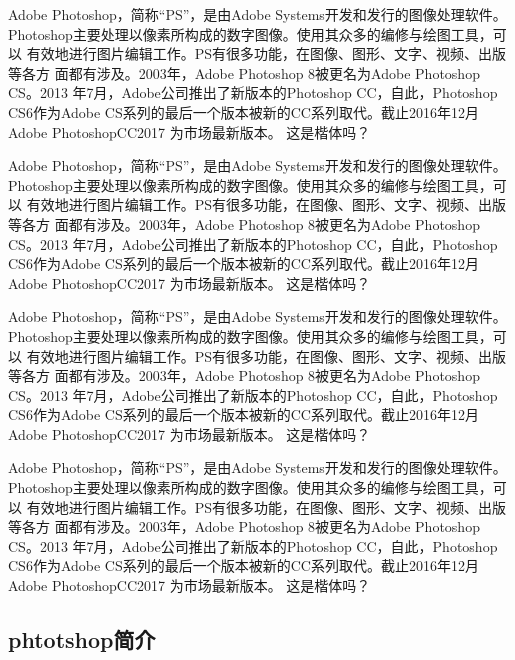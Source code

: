   Adobe Photoshop，简称“PS”，是由Adobe Systems开发和发行的图像处理软件。
 Photoshop主要处理以像素所构成的数字图像。使用其众多的编修与绘图工具，可以
 有效地进行图片编辑工作。PS有很多功能，在图像、图形、文字、视频、出版等各方
 面都有涉及。2003年，Adobe Photoshop 8被更名为Adobe Photoshop CS。2013
 年7月，Adobe公司推出了新版本的Photoshop CC，自此，Photoshop CS6作为Adobe
 CS系列的最后一个版本被新的CC系列取代。截止2016年12月Adobe PhotoshopCC2017
 为市场最新版本。
 {\kaishu 这是楷体吗？}
 
  Adobe Photoshop，简称“PS”，是由Adobe Systems开发和发行的图像处理软件。
 Photoshop主要处理以像素所构成的数字图像。使用其众多的编修与绘图工具，可以
 有效地进行图片编辑工作。PS有很多功能，在图像、图形、文字、视频、出版等各方
 面都有涉及。2003年，Adobe Photoshop 8被更名为Adobe Photoshop CS。2013
 年7月，Adobe公司推出了新版本的Photoshop CC，自此，Photoshop CS6作为Adobe
 CS系列的最后一个版本被新的CC系列取代。截止2016年12月Adobe PhotoshopCC2017
 为市场最新版本。
 {\kaishu 这是楷体吗？}
 
  Adobe Photoshop，简称“PS”，是由Adobe Systems开发和发行的图像处理软件。
 Photoshop主要处理以像素所构成的数字图像。使用其众多的编修与绘图工具，可以
 有效地进行图片编辑工作。PS有很多功能，在图像、图形、文字、视频、出版等各方
 面都有涉及。2003年，Adobe Photoshop 8被更名为Adobe Photoshop CS。2013
 年7月，Adobe公司推出了新版本的Photoshop CC，自此，Photoshop CS6作为Adobe
 CS系列的最后一个版本被新的CC系列取代。截止2016年12月Adobe PhotoshopCC2017
 为市场最新版本。
 {\kaishu 这是楷体吗？}
 
  Adobe Photoshop，简称“PS”，是由Adobe Systems开发和发行的图像处理软件。
 Photoshop主要处理以像素所构成的数字图像。使用其众多的编修与绘图工具，可以
 有效地进行图片编辑工作。PS有很多功能，在图像、图形、文字、视频、出版等各方
 面都有涉及。2003年，Adobe Photoshop 8被更名为Adobe Photoshop CS。2013
 年7月，Adobe公司推出了新版本的Photoshop CC，自此，Photoshop CS6作为Adobe
 CS系列的最后一个版本被新的CC系列取代。截止2016年12月Adobe PhotoshopCC2017
 为市场最新版本。
 {\kaishu 这是楷体吗？}
 
\subsection{phtotshop简介}
 \newpage